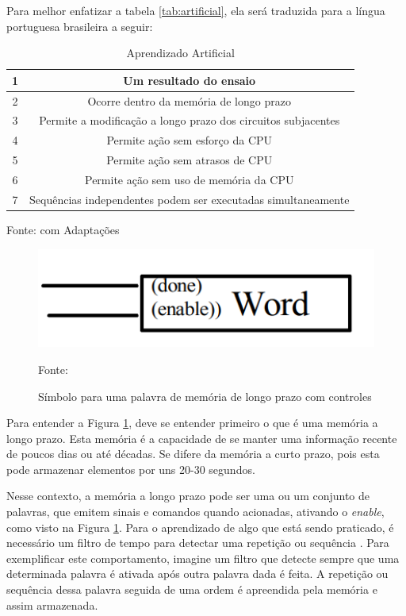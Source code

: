 Para melhor enfatizar a tabela \ref{tab:artificial}, ela será traduzida para a língua portuguesa brasileira a seguir:

\begin{table}[H]
\caption{Aprendizado Artificial}
\centering
\begin{tabular}{|c|c|}
\hline
1 & Um resultado do ensaio                    \\ \hline
2 & Ocorre dentro da memória de longo prazo \\ \hline
3 & Permite a modificação a longo prazo dos circuitos subjacentes \\ \hline
4 & Permite ação sem esforço da CPU \\ \hline
5 & Permite ação sem atrasos de CPU \\ \hline
6 & Permite ação sem uso de memória da CPU \\ \hline
7 & Sequências independentes podem ser executadas simultaneamente \\ \hline
\end{tabular}
Fonte: \cite{john} com Adaptações
\label{tab:artificialtraduzido}
\end{table}

\begin{figure}[H]
		\centering
		\includegraphics[width=14.5cm]{figuras/sinaisdememoria}
        \caption{Símbolo para uma palavra de memória de longo prazo com controles}
        Fonte: \cite{john}
		\label{img:palavra}
\end{figure}

Para entender a Figura \ref{img:palavra}, deve se entender primeiro o que é uma memória a longo prazo. Esta memória é a capacidade de se manter uma informação recente de poucos dias ou até décadas. Se difere da memória a curto prazo, pois esta pode armazenar elementos por uns 20-30 segundos.

Nesse contexto, a memória a longo prazo pode ser uma ou um conjunto de palavras, que emitem sinais e comandos quando acionadas, ativando o \textit{enable}, como visto na Figura \ref{img:palavra}. Para o aprendizado de algo que está sendo praticado, é necessário um filtro de tempo para detectar uma repetição ou sequência \cite{john}. Para exemplificar este comportamento, imagine um filtro que detecte sempre que uma determinada palavra é ativada após outra palavra dada é feita. A repetição ou sequência dessa palavra seguida de uma ordem é apreendida pela memória e assim armazenada.

